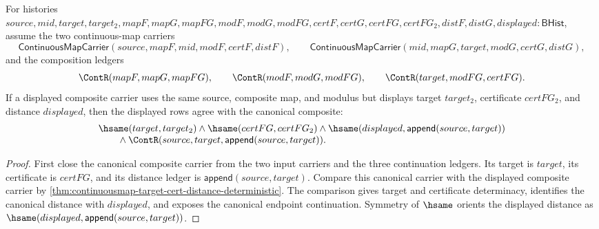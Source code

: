 \begin{theorem}
\label{thm:continuousmap-carrier-comp-target-cert-distance-deterministic}
For histories
$source,mid,target,target_2,mapF,mapG,mapFG,modF,modG,modFG,certF,certG,certFG,certFG_2,distF,distG,displayed:\mathsf{BHist}$,
assume the two continuous-map carriers
$$
\mathsf{ContinuousMapCarrier}(source,mapF,mid,modF,certF,distF),
\qquad
\mathsf{ContinuousMapCarrier}(mid,mapG,target,modG,certG,distG),
$$
and the composition ledgers
$$
\ContR(mapF,mapG,mapFG),\qquad
\ContR(modF,modG,modFG),\qquad
\ContR(target,modFG,certFG).
$$
If a displayed composite carrier uses the same source, composite map, and
modulus but displays target $target_2$, certificate $certFG_2$, and distance
$displayed$, then the displayed rows agree with the canonical composite:
$$
\begin{array}{l}
\hsame(target,target_2)\land \hsame(certFG,certFG_2)\land
\hsame(displayed,\mathsf{append}(source,target))\\
\qquad{}\land\ContR(source,target,\mathsf{append}(source,target)).
\end{array}
$$
\end{theorem}
\begin{proof}
First close the canonical composite carrier from the two input carriers and
the three continuation ledgers. Its target is $target$, its certificate is
$certFG$, and its distance ledger is $\mathsf{append}(source,target)$. Compare
this canonical carrier with the displayed composite carrier by
\autoref{thm:continuousmap-target-cert-distance-deterministic}. The comparison
gives target and certificate determinacy, identifies the canonical distance
with $displayed$, and exposes the canonical endpoint continuation. Symmetry of
$\hsame$ orients the displayed distance as
$\hsame(displayed,\mathsf{append}(source,target))$.
\end{proof}

